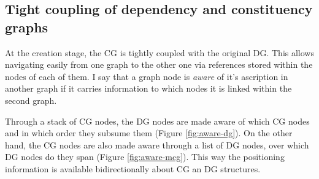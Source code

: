 \subsection{Tight coupling of dependency and constituency graphs}
\label{sec:tight-coupling}
At the creation stage, the CG is tightly coupled with the original DG. This allows navigating easily from one graph to the other one via references stored within the nodes of each of them. I say that a graph node is \textit{aware} of it's ascription in another graph if it carries information to which nodes it is linked within the second graph.


Through a stack of CG nodes, the DG nodes are made aware of which CG nodes and in which order they subsume them (Figure \ref{fig:aware-dg}). On the other hand, the CG nodes are also made aware through a list of DG nodes, over which DG nodes do they span (Figure \ref{fig:aware-mcg}). This way the positioning information is available bidirectionally about CG an DG structures.

